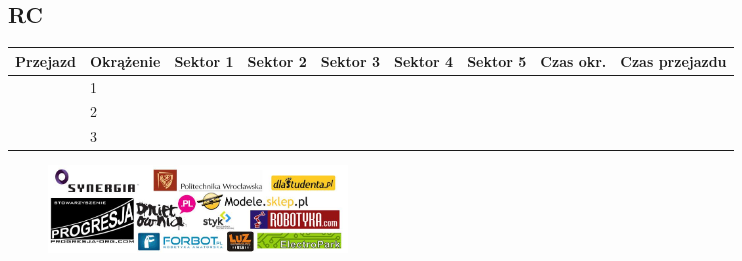 \documentclass[11pt]{article}
\begin{document}
\subsection{RC}
\begin{table}[h]
\begin{tabular}{|l|l|l|l|l|l|l|l|l|}
\hline
   Przejazd        & Okrążenie & Sektor 1 & Sektor 2 & Sektor 3 & Sektor 4 & Sektor 5 & Czas okr. & Czas przejazdu    \\ \hline
\multirow{3}{*}{} & 1         &          &          &          &          &          &           & \multirow{3}{*}{} \\ \cline{2-8}
                   & 2         &          &          &          &          &          &           &                  \\ \cline{2-8}
                   & 3         &          &          &          &          &          &           &                   \\ \hline
\end{tabular}
\end{table}
\clearpage
\newpage
\begin{figure}
\centering
\includegraphics[width=300px, keepaspectratio=true]
{images/sponsors.jpg}
\end{figure}
\end{document}
